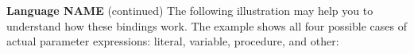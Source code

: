 \begin{minipage}[t]{\sw}
\slidenumber
\LARGE
{\bf Language NAME} (continued)\exx
The following illustration may help you to understand
how these bindings work.  The example shows all four
possible cases of actual parameter expressions:
literal, variable, procedure, and other:\exx
\centerline{}
\end{minipage}
\clearpage
